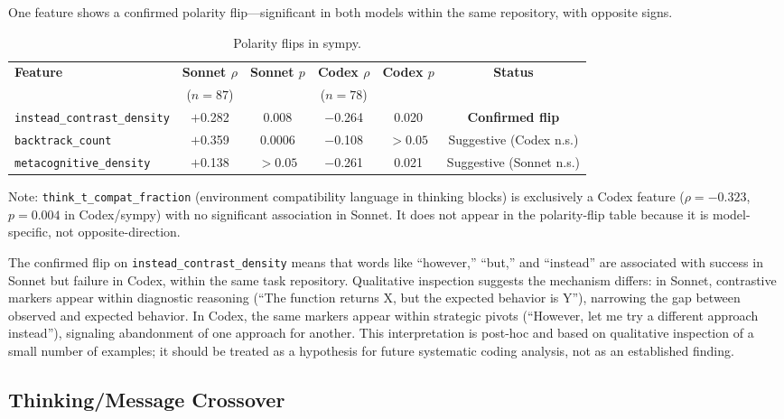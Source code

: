 \documentclass[11pt]{article}
\newcommand{\feat}[1]{\texttt{#1}}
\begin{document}
One feature shows a confirmed polarity flip---significant in both models within the same repository, with opposite signs.

\begin{table}[t]
\centering
\caption{Polarity flips in sympy.}
\label{tab:polarity}
\small
\begin{tabular}{lccccc}
\toprule
\textbf{Feature} & \textbf{Sonnet $\rho$} & \textbf{Sonnet $p$} & \textbf{Codex $\rho$} & \textbf{Codex $p$} & \textbf{Status} \\
 & ($n{=}87$) & & ($n{=}78$) & & \\
\midrule
\feat{instead\_contrast\_density} & $+$0.282 & 0.008 & $-$0.264 & 0.020 & \textbf{Confirmed flip} \\
\feat{backtrack\_count}           & $+$0.359 & 0.0006 & $-$0.108 & ${>}0.05$ & Suggestive (Codex n.s.) \\
\feat{metacognitive\_density}     & $+$0.138 & ${>}0.05$ & $-$0.261 & 0.021 & Suggestive (Sonnet n.s.) \\
\bottomrule
\end{tabular}
\end{table}

Note: \feat{think\_t\_compat\_fraction} (environment compatibility language in thinking blocks) is exclusively a Codex feature ($\rho = -0.323$, $p = 0.004$ in Codex/sympy) with no significant association in Sonnet. It does not appear in the polarity-flip table because it is model-specific, not opposite-direction.

The confirmed flip on \feat{instead\_contrast\_density} means that words like ``however,'' ``but,'' and ``instead'' are associated with success in Sonnet but failure in Codex, within the same task repository.
Qualitative inspection suggests the mechanism differs: in Sonnet, contrastive markers appear within diagnostic reasoning (``The function returns X, but the expected behavior is Y''), narrowing the gap between observed and expected behavior.
In Codex, the same markers appear within strategic pivots (``However, let me try a different approach instead''), signaling abandonment of one approach for another.
This interpretation is post-hoc and based on qualitative inspection of a small number of examples; it should be treated as a hypothesis for future systematic coding analysis, not as an established finding.


\subsection{Thinking/Message Crossover}
\label{sec:crossover}
\end{document}
